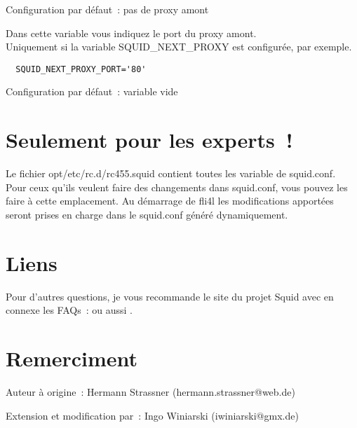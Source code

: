 \begin{description}
                Configuration par défaut~: pas de proxy amont



                Dans cette variable vous indiquez le port du proxy amont.\\
                Uniquement si la variable SQUID\_NEXT\_PROXY est configurée,
                par exemple.
\begin{verbatim}
  SQUID_NEXT_PROXY_PORT='80'
\end{verbatim}

                Configuration par défaut~: variable vide


\section{Seulement pour les experts~!}

Le fichier opt/etc/rc.d/rc455.squid contient toutes les variable de squid.conf.
Pour ceux qu'ils veulent faire des changements dans squid.conf, vous pouvez les
faire à cette emplacement. Au démarrage de fli4l les modifications apportées
seront prises en charge dans le squid.conf généré dynamiquement.

\section{Liens}

Pour d'autres questions, je vous recommande le site du projet Squid avec en
connexe les FAQs~:  ou aussi
.

\section{Remerciment}

Auteur à origine~: Hermann Strassner (hermann.strassner@web.de)

Extension et modification par~: Ingo Winiarski (iwiniarski@gmx.de)

\end{description}
